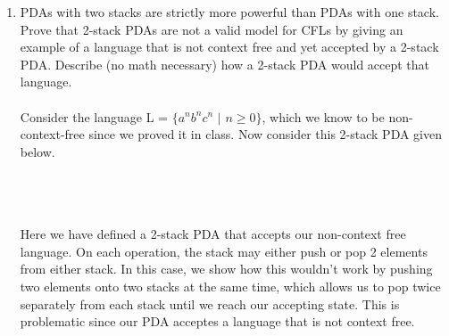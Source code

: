 \documentclass[12pt]{article}
\begin{document}
\begin{enumerate}
	\item PDAs with two stacks are strictly more powerful than PDAs with one stack. Prove
that 2-stack PDAs are not a valid model for CFLs by giving an example of a language that
is not context free and yet accepted by a 2-stack PDA. Describe (no math necessary) how a
2-stack PDA would accept that language. \\ \\
	Consider the language L = $\{a^nb^nc^n$ $|$ $n \geq 0\}$, which we know to be non-context-free since we proved it in class. Now consider this 2-stack PDA given below. \\ \\
 \\ \\
Here we have defined a 2-stack PDA that accepts our non-context free language. On each operation, the stack may either push or pop 2 elements from either stack. In this case, we show how this wouldn't work by pushing two elements onto two stacks at the same time, which allows us to pop twice separately from each stack until we reach our accepting state. 	This is problematic since our PDA acceptes a language that is not context free.
		
\end{enumerate}
\end{document}
